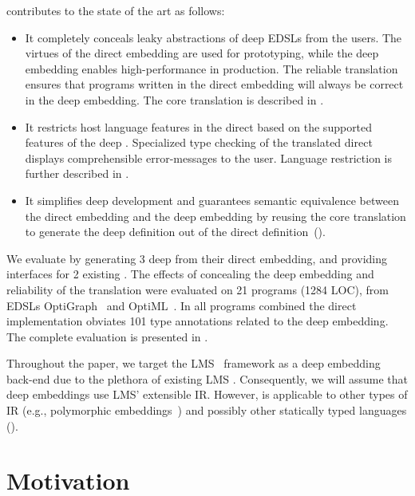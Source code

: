 \tool{} contributes to the state of the art as follows:
\begin{itemize}

\item It completely conceals leaky abstractions of deep EDSLs from the users.
The virtues of the direct embedding are used for prototyping, while the deep
embedding enables high-performance in production. The reliable translation
ensures that programs written in the direct embedding will always be correct
in the deep embedding. The core translation is described in .

\item It restricts host language features in the direct \edsl{} based on the
supported features of the deep \edsl{}. Specialized type checking of the
translated direct \edsl{} displays comprehensible error-messages to the user.
Language restriction is further described in .

\item It simplifies deep \edsl development and guarantees semantic equivalence
between the direct embedding and the deep embedding by reusing the core
translation to generate the deep \edsl definition out of the direct \edsl
definition~().


\end{itemize}
%
%
We evaluate \tool by generating 3 deep \edsls from their direct
embedding, and providing interfaces for 2 existing \edsls. The effects
of concealing the deep embedding and reliability of the translation
were evaluated on 21 programs (1284 LOC), from EDSLs
OptiGraph~\cite{composition-ecoop2013} and
OptiML~\cite{sujeeth_optiml:_2011}. In all programs combined the
direct implementation obviates 101 type annotations related to the
deep embedding. The complete evaluation is presented in
.

Throughout the paper, we target the LMS~\cite{rompf_lightweight_2012}
framework as a deep embedding back-end due to the plethora of existing
LMS \edsls.  Consequently, we will assume that deep embeddings use
LMS' extensible IR.  However, \tool is applicable to other types of IR
(e.g., polymorphic embeddings~\cite{hofer_polymorphic_2008}) and
possibly other statically typed languages ().

\section{Motivation}
\label{sec:motivation}

